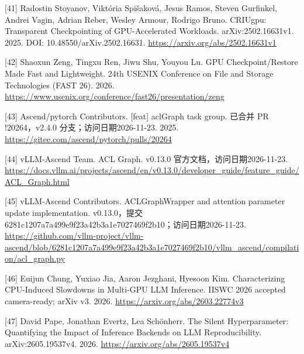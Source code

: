 \documentclass[UTF8,11pt,fontset=windows]{ctexart}
\begin{document}
\leavevmode{}%
{[}41{]} Radostin Stoyanov, Viktória Spišaková, Jesus Ramos, Steven Gurfinkel, Andrei Vagin, Adrian Reber, Wesley Armour, Rodrigo Bruno. CRIUgpu: Transparent Checkpointing of GPU-Accelerated Workloads. arXiv:2502.16631v1. 2025. DOI: 10.48550/arXiv.2502.16631. \url{https://arxiv.org/abs/2502.16631v1}

\leavevmode{}%
{[}42{]} Shaoxun Zeng, Tingxu Ren, Jiwu Shu, Youyou Lu. GPU Checkpoint/Restore Made Fast and Lightweight. 24th USENIX Conference on File and Storage Technologies (FAST 26). 2026. \url{https://www.usenix.org/conference/fast26/presentation/zeng}

\leavevmode{}%
{[}43{]} Ascend/pytorch Contributors. {[}feat{]} aclGraph task group. 已合并 PR !20264，v2.4.0 分支；访问日期2026-11-23. 2025. \url{https://gitee.com/ascend/pytorch/pulls/20264}

\leavevmode{}%
{[}44{]} vLLM-Ascend Team. ACL Graph. v0.13.0 官方文档，访问日期2026-11-23. \url{https://docs.vllm.ai/projects/ascend/en/v0.13.0/developer_guide/feature_guide/ACL_Graph.html}

\leavevmode{}%
{[}45{]} vLLM-Ascend Contributors. ACLGraphWrapper and attention parameter update implementation. v0.13.0，提交6281c1207a7a499e9f23a42b3a1e7027469f2b10；访问日期2026-11-23. \url{https://github.com/vllm-project/vllm-ascend/blob/6281c1207a7a499e9f23a42b3a1e7027469f2b10/vllm_ascend/compilation/acl_graph.py}

\leavevmode{}%
{[}46{]} Euijun Chung, Yuxiao Jia, Aaron Jezghani, Hyesoon Kim. Characterizing CPU-Induced Slowdowns in Multi-GPU LLM Inference. IISWC 2026 accepted camera-ready; arXiv v3. 2026. \url{https://arxiv.org/abs/2603.22774v3}

\leavevmode{}%
{[}47{]} David Pape, Jonathan Evertz, Lea Schönherr. The Silent Hyperparameter: Quantifying the Impact of Inference Backends on LLM Reproducibility. arXiv:2605.19537v4. 2026. \url{https://arxiv.org/abs/2605.19537v4}
\end{document}
